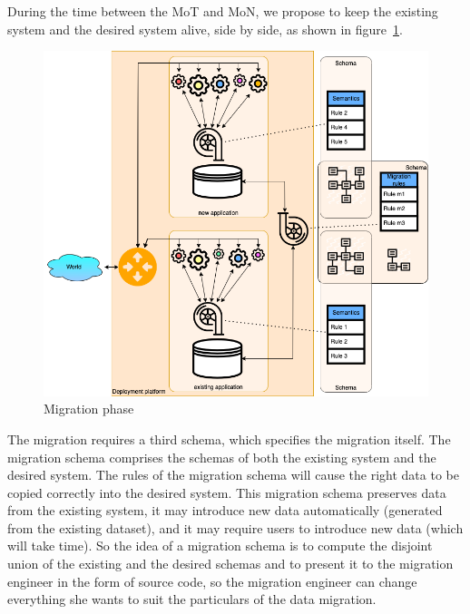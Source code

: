\documentclass{elsarticle}
\begin{document}
   During the time between the MoT and MoN,
   we propose to keep the existing system and the desired system alive, side by side, as shown in figure~\ref{fig:migration phase}.
\begin{figure}[bht]
   \begin{center}
     \includegraphics[scale=.35]{datamigration-Migration phase.drawio.png}
   \end{center}
\caption{Migration phase}
\label{fig:migration phase}
\end{figure}

   The migration requires a third schema, which specifies the migration itself.
   The migration schema comprises the schemas of both the existing system and the desired system.
   The rules of the migration schema will cause the right data to be copied correctly into the desired system.
   This migration schema preserves data from the existing system, it may introduce new data automatically (generated from the existing dataset),
   and it may require users to introduce new data (which will take time). 
   So the idea of a migration schema is to compute the disjoint union of the existing and the desired schemas
   and to present it to the migration engineer in the form of source code,
   so the migration engineer can change everything she wants to suit the particulars of the data migration.
\end{document}
